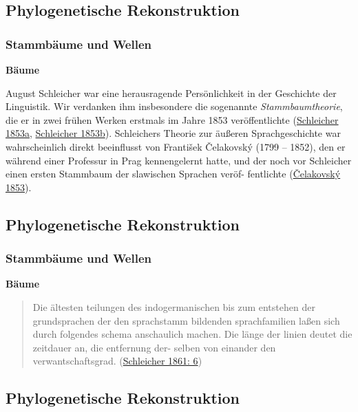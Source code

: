 \subsection{\texorpdfstring{{Phylogenetische
Rekonstruktion}}{Phylogenetische Rekonstruktion}}

\subsubsection{\texorpdfstring{{Stammbäume und
Wellen}}{Stammbäume und Wellen}}

\textbf{Bäume}

August Schleicher war eine herausragende Persönlichkeit in der
Geschichte der Linguistik. Wir verdanken ihm insbesondere die sogenannte
\emph{Stammbaumtheorie}, die er in zwei frühen Werken erstmals im Jahre
1853 veröffentlichte
(\href{http://bibliography.lingpy.org?key=Schleicher1853}{Schleicher
1853a},
\href{http://bibliography.lingpy.org?key=Schleicher1853a}{Schleicher
1853b}). Schleichers Theorie zur äußeren Sprachgeschichte war
wahrscheinlich direkt beeinflusst von František Čelakovský (1799 --
1852), den er während einer Professur in Prag kennengelernt hatte, und
der noch vor Schleicher einen ersten Stammbaum der slawischen Sprachen
veröf- fentlichte
(\href{http://bibliography.lingpy.org?key=Celakovsky1853}{Čelakovský
1853}).

\subsection{\texorpdfstring{{Phylogenetische
Rekonstruktion}}{Phylogenetische Rekonstruktion}}

\subsubsection{\texorpdfstring{{Stammbäume und
Wellen}}{Stammbäume und Wellen}}

\textbf{Bäume}

\begin{quote}
Die ältesten teilungen des indogermanischen bis zum entstehen der
grundsprachen der den sprachstamm bildenden sprachfamilien laßen sich
durch folgendes schema anschaulich machen. Die länge der linien deutet
die zeitdauer an, die entfernung der- selben von einander den
verwantschaftsgrad.
(\href{http://bibliography.lingpy.org?key=Schleicher1861}{Schleicher
1861: 6})
\end{quote}

\subsection{\texorpdfstring{{Phylogenetische
Rekonstruktion}}{Phylogenetische Rekonstruktion}}

